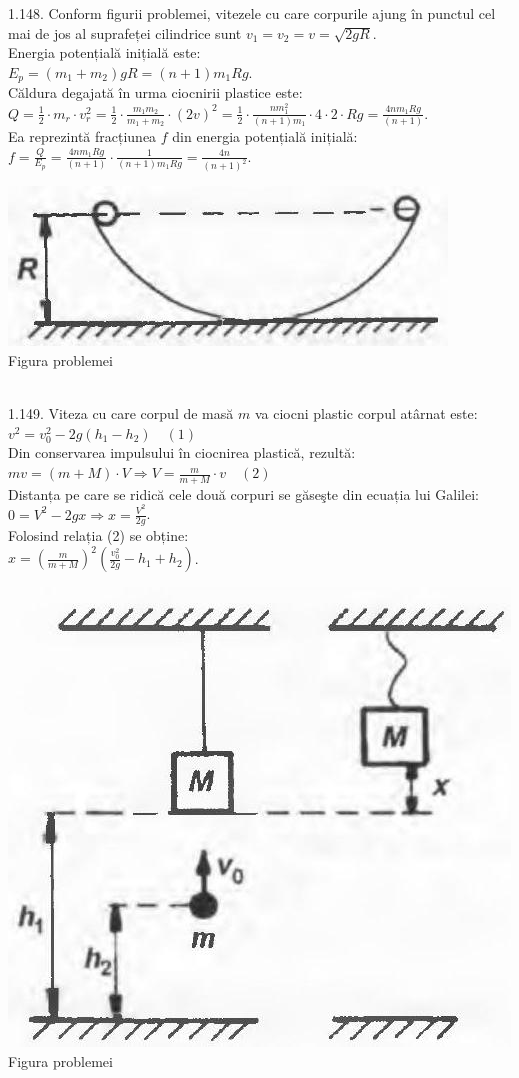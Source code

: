 1.148. Conform figurii problemei, vitezele cu care corpurile ajung în punctul cel mai de jos al suprafeței cilindrice sunt $v_{1}=v_{2}=v=\sqrt{2 g R}$.\\ Energia potențială inițială este:\\ $E_{p}=\left(m_{1}+m_{2}\right) g R=(n+1) m_{1} R g$.\\ Căldura degajată în urma ciocnirii plastice este:\\ $Q=\frac{1}{2} \cdot m_{r} \cdot v_{r}^{2}=\frac{1}{2} \cdot \frac{m_{1} m_{2}}{m_{1}+m_{2}} \cdot(2 v)^{2}=\frac{1}{2} \cdot \frac{n m_{1}^{2}}{(n+1) m_{1}} \cdot 4 \cdot 2 \cdot R g=\frac{4 n m_{1} R g}{(n+1)}$.\\ Ea reprezintă fracțiunea $f$ din energia potențială inițială:\\ $f=\frac{Q}{E_{p}}=\frac{4 n m_{1} R g}{(n+1)} \cdot \frac{1}{(n+1) m_{1} R g}=\frac{4 n}{(n+1)^{2}}$.\\ \begin{center} \includegraphics[width=0.4\linewidth]{images/2025_07_01_5b3ff9fa0d508c8e9f17g-229(1)}\\ Figura problemei \end{center}\\

1.149. Viteza cu care corpul de masă $m$ va ciocni plastic corpul atârnat este:\\ $v^{2}=v_{0}^{2}-2 g\left(h_{1}-h_{2}\right) \quad (1)$\\ Din conservarea impulsului în ciocnirea plastică, rezultă:\\ $m v=(m+M) \cdot V \Rightarrow V=\frac{m}{m+M} \cdot v \quad (2)$\\ Distanța pe care se ridică cele două corpuri se găseşte din ecuația lui Galilei:\\ $0=V^{2}-2 g x \Rightarrow x=\frac{V^{2}}{2 g}$.\\ Folosind relația (2) se obține:\\ $x=\left(\frac{m}{m+M}\right)^{2}\left(\frac{v_{0}^{2}}{2 g}-h_{1}+h_{2}\right)$.\\ \begin{center} \includegraphics[width=0.4\linewidth]{images/2025_07_01_5b3ff9fa0d508c8e9f17g-230}\\ Figura problemei \end{center}\\

